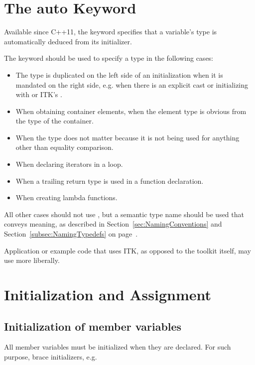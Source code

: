 \section{The auto Keyword}%
\label{sec:TheAutoKeyword}

Available since C++11, the  keyword specifies that a variable's type
is automatically deduced from its initializer.

The  keyword should be used to specify a type in the following cases:

\begin{itemize}
\item The type is duplicated on the left side of an initialization when it is mandated on the
	right side, e.g. when there is an explicit cast or initializing with  or ITK's .
\item When obtaining container elements, when the element type is obvious from the type
      of the container.
\item When the type does not matter because it is not being used for anything other
      than equality comparison.
\item When declaring iterators in a  loop.
\item When a trailing return type is used in a function declaration.
\item When creating lambda functions.
\end{itemize}

All other cases should not use , but a semantic type name
should be used that conveys meaning, as described in Section~\ref{sec:NamingConventions}
and Section~\ref{subsec:NamingTypedefs} on page~\pageref{subsec:NamingTypedefs}.

Application or example code that uses ITK, as opposed to the toolkit itself,
may use  more liberally.


\section{Initialization and Assignment}%
\label{sec:IniitalizationAndAssignment}

\subsection{Initialization of member variables}%
\label{subsec:InitializationOfMemberVariables}

All member variables must be initialized when they are declared. For such
purpose, brace initializers, e.g.

